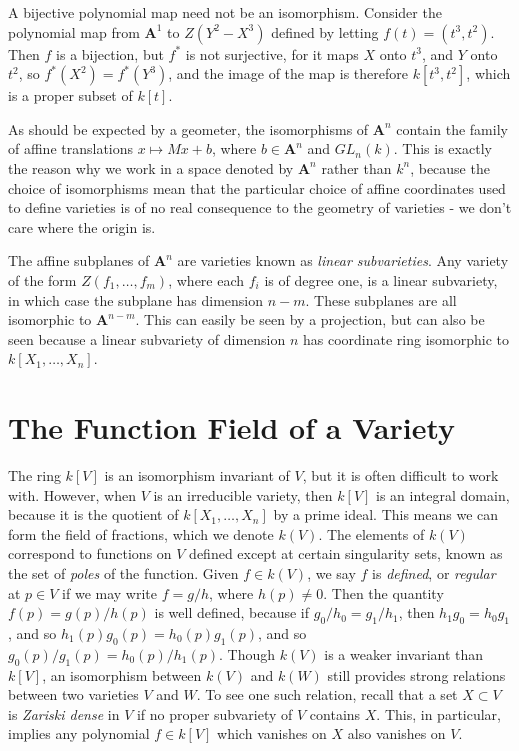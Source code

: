 \begin{example}
    A bijective polynomial map need not be an isomorphism. Consider the polynomial map from $\mathbf{A}^1$ to $Z(Y^2-X^3)$ defined by letting $f(t) = (t^3,t^2)$. Then $f$ is a bijection, but $f^*$ is not surjective, for it maps $X$ onto $t^3$, and $Y$ onto $t^2$, so $f^*(X^2) = f^*(Y^3)$, and the image of the map is therefore $k[t^3,t^2]$, which is a proper subset of $k[t]$.
\end{example}

As should be expected by a geometer, the isomorphisms of $\mathbf{A}^n$ contain the family of affine translations $x \mapsto Mx + b$, where $b \in \mathbf{A}^n$ and $GL_n(k)$. This is exactly the reason why we work in a space denoted by $\mathbf{A}^n$ rather than $k^n$, because the choice of isomorphisms mean that the particular choice of affine coordinates used to define varieties is of no real consequence to the geometry of varieties - we don't care where the origin is.

\begin{example}
    The affine subplanes of $\mathbf{A}^n$ are varieties known as \emph{linear subvarieties}. Any variety of the form $Z(f_1, \dots, f_m)$, where each $f_i$ is of degree one, is a linear subvariety, in which case the subplane has dimension $n-m$. These subplanes are all isomorphic to $\mathbf{A}^{n-m}$. This can easily be seen by a projection, but can also be seen because a linear subvariety of dimension $n$ has coordinate ring isomorphic to $k[X_1, \dots, X_n]$.
\end{example}

\section{The Function Field of a Variety}

The ring $k[V]$ is an isomorphism invariant of $V$, but it is often difficult to work with. However, when $V$ is an irreducible variety, then $k[V]$ is an integral domain, because it is the quotient of $k[X_1, \dots, X_n]$ by a prime ideal. This means we can form the field of fractions, which we denote $k(V)$. The elements of $k(V)$ correspond to functions on $V$ defined except at certain singularity sets, known as the set of \emph{poles} of the function. Given $f \in k(V)$, we say $f$ is \emph{defined}, or \emph{regular} at $p \in V$ if we may write $f = g/h$, where $h(p) \neq 0$. Then the quantity $f(p) = g(p)/h(p)$ is well defined, because if $g_0/h_0 = g_1/h_1$, then $h_1g_0 = h_0g_1$, and so $h_1(p) g_0(p) = h_0(p) g_1(p)$, and so $g_0(p)/g_1(p) = h_0(p)/h_1(p)$. Though $k(V)$ is a weaker invariant than $k[V]$, an isomorphism between $k(V)$ and $k(W)$ still provides strong relations between two varieties $V$ and $W$. To see one such relation, recall that a set $X \subset V$ is \emph{Zariski dense} in $V$ if no proper subvariety of $V$ contains $X$. This, in particular, implies any polynomial $f \in k[V]$ which vanishes on $X$ also vanishes on $V$.

